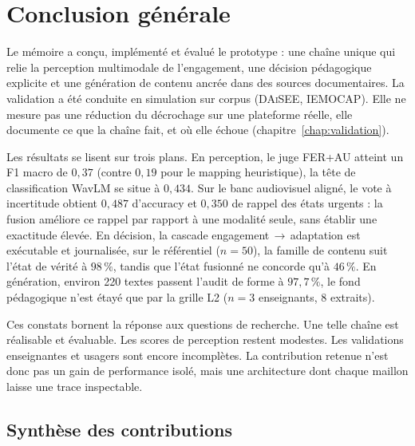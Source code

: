 \chapter*{\textbf{Conclusion générale}}
\mtcaddchapter %
\label{chap:conclusion}
\thispagestyle{plain}
\setcounter{chapter}{6}%
\setcounter{table}{0}

Le mémoire a conçu, implémenté et évalué le prototype \emolearn{} :
une chaîne unique qui relie la perception multimodale de l'engagement,
une décision pédagogique explicite et une génération de contenu ancrée
dans des sources documentaires. La validation a été conduite en
simulation sur corpus (\textsc{DAiSEE}, \textsc{IEMOCAP}). Elle ne
mesure pas une réduction du décrochage sur une plateforme réelle, elle
documente ce que la chaîne fait, et où elle échoue
(chapitre~\ref{chap:validation}).

Les résultats se lisent sur trois plans. En perception, le juge FER+AU
atteint un F1 macro de $0{,}37$ (contre $0{,}19$ pour le mapping
heuristique), la tête de classification WavLM se situe à $0{,}434$.
Sur le banc audiovisuel aligné, le vote à incertitude obtient $0{,}487$
d'accuracy et $0{,}350$ de rappel des états urgents : la fusion
améliore ce rappel par rapport à une modalité seule, sans établir une
exactitude élevée. En décision, la cascade
engagement\,$\rightarrow$\,adaptation est exécutable et journalisée, 
sur le référentiel ($n=50$), la famille de contenu suit l'état de
vérité à $98\,\%$, tandis que l'état fusionné ne concorde qu'à
$46\,\%$. En génération, environ 220 textes passent l'audit de forme à
$97{,}7\,\%$, le fond pédagogique n'est étayé que par la grille L2
($n=3$ enseignants, 8 extraits).

Ces constats bornent la réponse aux questions de recherche. Une telle
chaîne est réalisable et évaluable. Les scores de perception restent
modestes. Les validations enseignantes et usagers sont encore
incomplètes. La contribution retenue n'est donc pas un gain de
performance isolé, mais une architecture dont chaque maillon laisse une
trace inspectable.

\section*{Synthèse des contributions}

